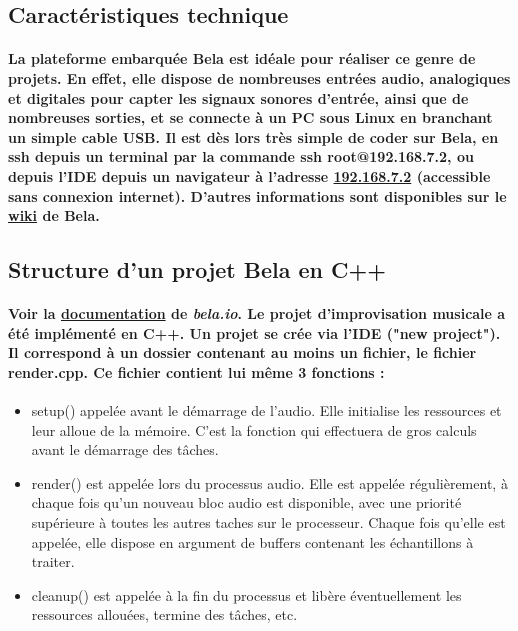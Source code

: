 \documentclass[a4paper]{article}
\begin{document}
\subsection{Caractéristiques technique} \paragraph{La plateforme embarquée Bela
est idéale pour réaliser ce genre de projets. En effet, elle dispose de
nombreuses entrées audio, analogiques et digitales pour capter les signaux
sonores d’entrée, ainsi que de nombreuses sorties, et se connecte à un PC sous
Linux en branchant un simple cable USB. Il est dès lors très simple de coder sur
Bela, en ssh depuis un terminal par la commande ssh root@192.168.7.2, ou depuis
l’IDE depuis un navigateur à l’adresse \href{http://192.168.7.2/}{192.168.7.2}
(accessible sans connexion internet). D’autres informations sont disponibles sur
le \href{https://github.com/BelaPlatform/Bela/wiki}{wiki} de Bela.}

\subsection{Structure d'un projet Bela en C++} \paragraph{Voir la
\href{https://github.com/BelaPlatform/Bela/wiki/Example-projects-and-tutorials}{documentation}
de \textit{bela.io}. Le projet d’improvisation musicale a été implémenté en C++.
Un projet se crée via l’IDE ("new project"). Il correspond à un dossier
contenant au moins un fichier, le fichier render.cpp. Ce fichier contient lui
même 3 fonctions :}

\begin{itemize} \item setup() appelée avant le démarrage de l’audio. Elle
initialise les ressources et leur alloue de la mémoire. C'est la fonction qui
effectuera de gros calculs avant le démarrage des tâches. \item render() est
appelée lors du processus audio. Elle est appelée régulièrement, à chaque fois
qu’un nouveau bloc audio est disponible, avec une priorité supérieure à toutes
les autres taches sur le processeur. Chaque fois qu’elle est appelée, elle
dispose en argument de buffers contenant les échantillons à traiter. \item
cleanup() est appelée à la fin du processus et libère éventuellement les
ressources allouées, termine des tâches, etc. \end{itemize}
\end{document}
